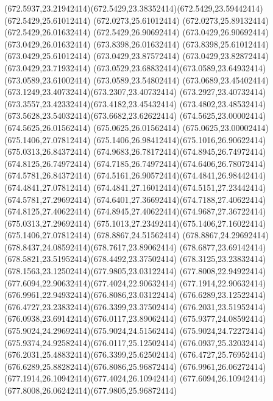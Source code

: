 {{	\curveto(672.5937,23.21942414)(672.5429,23.38352414)(672.5429,23.59442414)
	\lineto(672.5429,25.61012414)
	\lineto(672.0273,25.61012414)
	\lineto(672.0273,25.89132414)
	\lineto(672.5429,26.01632414)
	\lineto(672.5429,26.90692414)
	\lineto(673.0429,26.90692414)
	\lineto(673.0429,26.01632414)
	\lineto(673.8398,26.01632414)
	\lineto(673.8398,25.61012414)
	\lineto(673.0429,25.61012414)
	\lineto(673.0429,23.87572414)
	\lineto(673.0429,23.82872414)
	\lineto(673.0429,23.71932414)
	\curveto(673.0529,23.68832414)(673.0589,23.64932414)(673.0589,23.61002414)
	\lineto(673.0589,23.54802414)
	\curveto(673.0689,23.45402414)(673.1249,23.40732414)(673.2307,23.40732414)
	\curveto(673.2927,23.40732414)(673.3557,23.42332414)(673.4182,23.45432414)
	\curveto(673.4802,23.48532414)(673.5628,23.54032414)(673.6682,23.62622414)
	\closepath
	\moveto(674.5625,23.00002414)
	\lineto(674.5625,26.01562414)
	\lineto(675.0625,26.01562414)
	\lineto(675.0625,23.00002414)
	\closepath
	\moveto(675.1406,27.07812414)
	\curveto(675.1406,26.98412414)(675.1016,26.90622414)(675.0313,26.84372414)
	\curveto(674.9683,26.78172414)(674.8945,26.74972414)(674.8125,26.74972414)
	\curveto(674.7185,26.74972414)(674.6406,26.78072414)(674.5781,26.84372414)
	\curveto(674.5161,26.90572414)(674.4841,26.98442414)(674.4841,27.07812414)
	\curveto(674.4841,27.16012414)(674.5151,27.23442414)(674.5781,27.29692414)
	\curveto(674.6401,27.36692414)(674.7188,27.40622414)(674.8125,27.40622414)
	\curveto(674.8945,27.40622414)(674.9687,27.36722414)(675.0313,27.29692414)
	\curveto(675.1013,27.23492414)(675.1406,27.16022414)(675.1406,27.07812414)
	\closepath
	\moveto(678.8867,24.51562414)
	\curveto(678.8867,24.29692414)(678.8437,24.08592414)(678.7617,23.89062414)
	\curveto(678.6877,23.69142414)(678.5821,23.51952414)(678.4492,23.37502414)
	\curveto(678.3125,23.23832414)(678.1563,23.12502414)(677.9805,23.03122414)
	\curveto(677.8008,22.94922414)(677.6094,22.90632414)(677.4024,22.90632414)
	\curveto(677.1914,22.90632414)(676.9961,22.94932414)(676.8086,23.03122414)
	\curveto(676.6289,23.12522414)(676.4727,23.23832414)(676.3399,23.37502414)
	\curveto(676.2031,23.51952414)(676.0938,23.69142414)(676.0117,23.89062414)
	\curveto(675.9377,24.08592414)(675.9024,24.29692414)(675.9024,24.51562414)
	\curveto(675.9024,24.72272414)(675.9374,24.92582414)(676.0117,25.12502414)
	\curveto(676.0937,25.32032414)(676.2031,25.48832414)(676.3399,25.62502414)
	\curveto(676.4727,25.76952414)(676.6289,25.88282414)(676.8086,25.96872414)
	\curveto(676.9961,26.06272414)(677.1914,26.10942414)(677.4024,26.10942414)
	\curveto(677.6094,26.10942414)(677.8008,26.06242414)(677.9805,25.96872414)
}}
